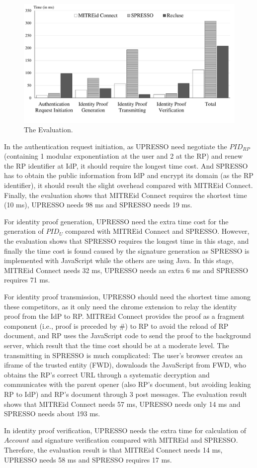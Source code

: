 \begin{figure}
  \centering
  \includegraphics[width=\linewidth]{fig/evaluation2.pdf}
  \caption{The Evaluation.}
  \label{fig:evaluation}
\end{figure}
In the authentication request initiation, as UPRESSO need negotiate the $PID_{RP}$ (containing 1 modular exponentiation at the user and 2 at the RP) and renew the RP identifier at IdP, it should require the longest time cost. And SPRESSO has to obtain the public information from IdP and encrypt its domain (as the RP identifier), it should result the slight overhead compared with MITREid Connect. Finally, the evaluation shows that MITREid Connect requires the shortest time (10 ms), UPRESSO needs 98 ms and SPRESSO needs 19 ms.

For identity proof generation, UPRESSO need the extra time cost for the generation of $PID_U$ compared with MITREid Connect and SPRESSO. However, the evaluation shows that SPRESSO requires the longest time in this stage, and finally the time cost is found caused by the signature generation as SPRESSO is implemented with JavaScript while the others are using Java. In this stage, MITREid Connect needs 32 ms, UPRESSO needs an extra 6 ms and SPRESSO requires 71 ms. 

For identity proof transmission, UPRESSO should need the shortest time among these competitors, as it only need the chrome extension to relay the identity proof from the IdP to RP. MITREid Connect provides the proof as a fragment component (i.e., proof is preceded by \#) to RP to avoid the reload of RP document, and RP uses the JavaScript code to send the proof to the background server, which result that the time cost should be at a moderate level. The transmitting in SPRESSO is much complicated: The user's browser creates an iframe of the trusted entity (FWD), downloads the JavaScript from FWD, who obtains the RP's correct URL through a systematic decryption and communicates with the parent opener (also RP's document, but avoiding leaking RP to IdP) and RP's document through 3 post messages. The evaluation result shows that MITREid Connect needs 57 ms, UPRESSO needs only 14 ms and SPRESSO needs about 193 ms.

In identity proof verification, UPRESSO needs the extra time for calculation of $Account$ and signature verification compared with MITREid and SPRESSO. Therefore, the evaluation result is that MITREid Connect needs 14 ms, UPRESSO needs 58 ms and SPRESSO requires 17 ms.



